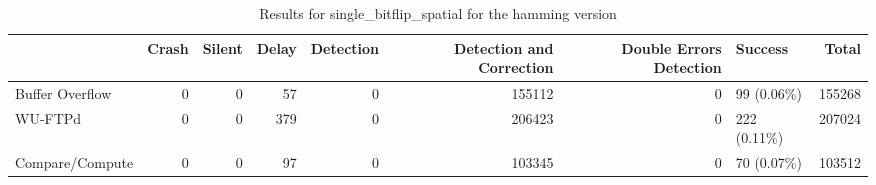 \begin{table}[t]
	\centering
	\caption{Results for single_bitflip_spatial for the hamming version}
	\label{table:end_sim_by_status_hamming_4_single_bitflip_spatial}
	\begin{tabular}{lrrrrrrlr}
		\toprule
		                & Crash & Silent & Delay & Detection & Detection and Correction & Double Errors Detection & Success      & Total  \\
		\midrule
		Buffer Overflow & 0     & 0      & 57    & 0         & 155112                   & 0                       & 99 (0.06\%)  & 155268 \\
		WU-FTPd         & 0     & 0      & 379   & 0         & 206423                   & 0                       & 222 (0.11\%) & 207024 \\
		Compare/Compute & 0     & 0      & 97    & 0         & 103345                   & 0                       & 70 (0.07\%)  & 103512 \\
		\bottomrule
	\end{tabular}
\end{table}
